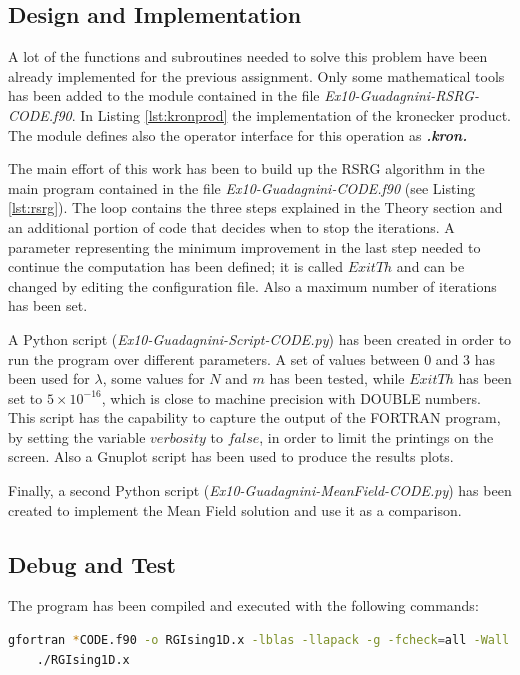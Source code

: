 \documentclass[11pt,a4paper]{article}
\begin{document}
\subsection{Design and Implementation}
A lot of the functions and subroutines needed to solve this problem have been already implemented for the previous assignment. Only some mathematical tools has been added to the module contained in the file \textit{Ex10-Guadagnini-RSRG-CODE.f90}. 
In Listing \ref{lst:kronprod} the implementation of the kronecker product. The module defines also the operator interface for this operation as \textit{\textbf{.kron.}}



The main effort of this work has been to build up the RSRG algorithm in the main program contained in the file \textit{Ex10-Guadagnini-CODE.f90} (see Listing \ref{lst:rsrg}). 
The loop contains the three steps explained in the Theory section and an additional portion of code that decides when to stop the iterations. A parameter representing the minimum improvement in the last step needed to continue the computation has been defined; it is called $ExitTh$ and can be changed by editing the configuration file. Also a maximum number of iterations has been set.



A Python script (\textit{Ex10-Guadagnini-Script-CODE.py}) has been created in order to run the program over different parameters. A set of values between $0$ and $3$ has been used for $\lambda$, some values for $N$ and $m$ has been tested, while $ExitTh$ has been set to $5 \times 10^{-16}$, which is close to machine precision with DOUBLE numbers. 
This script has the capability to capture the output of the FORTRAN program, by setting the variable $verbosity$ to $false$, in order to limit the printings on the screen.
Also a Gnuplot script has been used to produce the results plots.

Finally, a second Python script (\textit{Ex10-Guadagnini-MeanField-CODE.py}) has been created to implement the Mean Field solution and use it as a comparison. 

\subsection{Debug and Test}
The program has been compiled and executed with the following commands:
\begin{lstlisting}[language=BASH,numbers=none]
	gfortran *CODE.f90 -o RGIsing1D.x -lblas -llapack -g -fcheck=all -Wall
	./RGIsing1D.x
\end{lstlisting}
\end{document}
